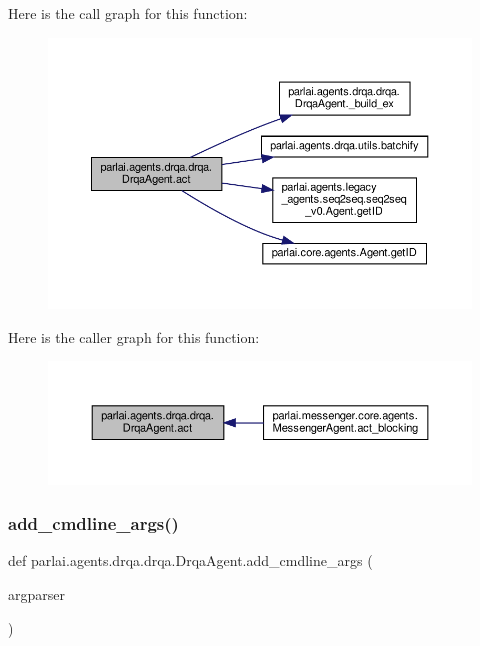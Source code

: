 Here is the call graph for this function\+:
\nopagebreak
\begin{figure}[H]
\begin{center}
\leavevmode
\includegraphics[width=350pt]{classparlai_1_1agents_1_1drqa_1_1drqa_1_1DrqaAgent_a2eac2d9d7425e7cbf19b06e2433205ff_cgraph}
\end{center}
\end{figure}
Here is the caller graph for this function\+:
\nopagebreak
\begin{figure}[H]
\begin{center}
\leavevmode
\includegraphics[width=350pt]{classparlai_1_1agents_1_1drqa_1_1drqa_1_1DrqaAgent_a2eac2d9d7425e7cbf19b06e2433205ff_icgraph}
\end{center}
\end{figure}
\mbox{\label{classparlai_1_1agents_1_1drqa_1_1drqa_1_1DrqaAgent_a3469159780c52ff1a4d4309dddf250ff}} 
\subsubsection{\texorpdfstring{add\+\_\+cmdline\+\_\+args()}{add\_cmdline\_args()}}
{\footnotesize\ttfamily def parlai.\+agents.\+drqa.\+drqa.\+Drqa\+Agent.\+add\+\_\+cmdline\+\_\+args (\begin{DoxyParamCaption}\item[{}]{argparser }\end{DoxyParamCaption})\hspace{0.3cm}{\ttfamily [static]}}



